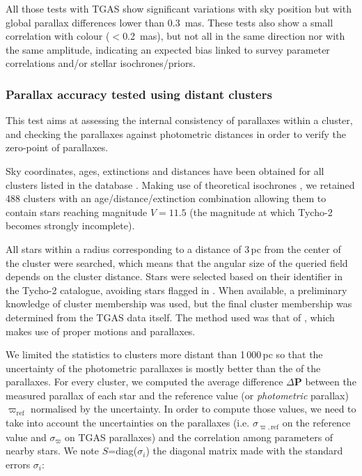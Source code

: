 All those tests with TGAS show significant variations with sky position but with global parallax differences lower than 0.3~mas. 
These tests also show a small correlation with colour ($<$0.2~mas), but not all in the same direction nor with the same amplitude, indicating an expected bias linked to survey parameter correlations and/or stellar isochrones/priors. 




\subsubsection{Parallax accuracy tested using distant clusters}\label{sssec:cu9val_ocpar}

This test aims at assessing the internal consistency of parallaxes within a cluster, and checking the parallaxes against photometric distances in order to verify the zero-point of parallaxes. 

Sky coordinates, ages, extinctions and distances have been obtained for all clusters listed in the \citet{2014A&A...564A..79D} database \citep{1995ASSL..203..127M}. Making use of theoretical isochrones \citep{Bressan12}, we retained 488 clusters with an age/distance/extinction combination allowing them to contain stars reaching magnitude $V=11.5$ (the magnitude at which Tycho-2 becomes strongly incomplete). 

All stars within a radius corresponding to a distance of 3\,pc from the center of the cluster were searched, which means that the angular size of the queried field depends on the cluster distance.
Stars were selected based on their identifier in the Tycho-2 catalogue, avoiding  stars flagged in \citet{2002A&A...384..180F}. When available, a preliminary knowledge of cluster membership was used, but the final cluster membership was determined from the TGAS data itself. The method used was that of \citet{1999A&A...345..471R}, which makes use of proper motions and parallaxes. 

We limited the statistics to clusters more distant than 1\,000\,pc 
so that the uncertainty of the photometric parallaxes is mostly better than the  of the {} parallaxes.
 For every cluster, we computed the average difference $\Delta\mathbf{P}$ between the measured parallax of each star and the reference value (or \textit{photometric} parallax) $\varpi_\mathrm{ref}$ normalised by the uncertainty. 
 In order to compute those values, we need to take into account the  uncertainties on the parallaxes (i.e. $\sigma_\mathrm{\varpi,ref}$ on the reference value and $\sigma_{\varpi}$ on TGAS parallaxes) and the correlation among parameters of nearby stars. We note $S$=diag($\sigma_{i}$) the diagonal matrix made with the standard errors $\sigma_{i}$:



